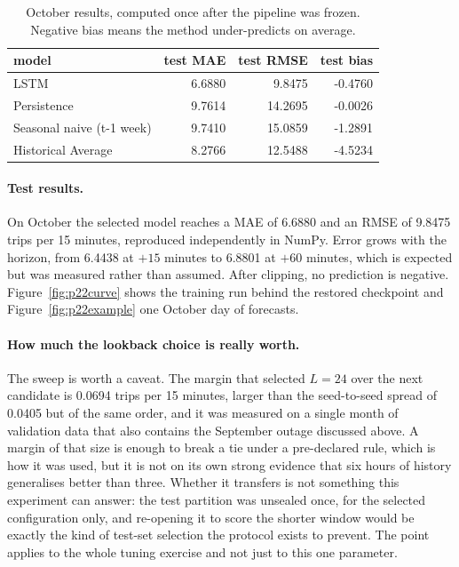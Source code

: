 \documentclass[11pt,a4paper]{article}
\begin{document}
\begin{table}[H]
\centering
\caption{October results, computed once after the pipeline was frozen. Negative bias means the method under-predicts on average.}
\label{tab:p2test}
\begin{tabular}{lrrr}
\toprule
model & test MAE & test RMSE & test bias \\
\midrule
LSTM & 6.6880 & 9.8475 & -0.4760 \\
Persistence & 9.7614 & 14.2695 & -0.0026 \\
Seasonal naive (t-1 week) & 9.7410 & 15.0859 & -1.2891 \\
Historical Average & 8.2766 & 12.5488 & -4.5234 \\
\bottomrule
\end{tabular}
\end{table}

\paragraph{Test results.} On October the selected model reaches a MAE of
6.6880 and an RMSE of 9.8475 trips per 15
minutes, reproduced independently in NumPy. Error grows with the horizon, from
6.4438 at $+15$ minutes to 6.8801 at
$+60$ minutes, which is expected but was measured rather than assumed. After
clipping, no prediction is negative. Figure~\ref{fig:p22curve} shows the training
run behind the restored checkpoint and Figure~\ref{fig:p22example} one October day
of forecasts.

\paragraph{How much the lookback choice is really worth.} The sweep is worth a
caveat. The margin that selected $L=24$ over the
next candidate is 0.0694 trips per 15 minutes,
larger than the seed-to-seed spread of 0.0405 but of the
same order, and it was measured on a single month of validation data that also
contains the September outage discussed above. A margin of that size is enough to
break a tie under a pre-declared rule, which is how it was used, but it is not on its
own strong evidence that six hours of history generalises better than three. Whether
it transfers is not something this experiment can answer: the test partition was
unsealed once, for the selected configuration only, and re-opening it to score the
shorter window would be exactly the kind of test-set selection the protocol exists to
prevent. The point applies to the whole tuning exercise and not just to this one
parameter.
\end{document}
